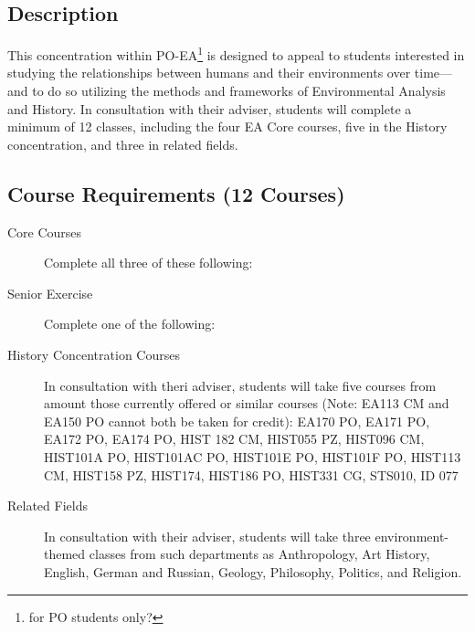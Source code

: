 \documentclass{article}\usepackage[]{graphicx}\usepackage[]{xcolor}
\newenvironment{itemize*}%
  {\begin{itemize}%
    \setlength{\itemsep}{0pt}%
    \setlength{\parskip}{0pt}}%
  {\end{itemize}}
\begin{document}
\subsection{Description}

This concentration within PO-EA\footnote{for PO students only?} is designed to appeal to students interested in studying the relationships between humans and their environments over time—and to do so utilizing the methods and frameworks of Environmental Analysis and History. In consultation with their adviser, students will complete a minimum of 12 classes, including the four EA Core courses, five in the History concentration, and three in related fields.

\subsection{Course Requirements (12 Courses)}

\begin{description}

 \item[Core Courses] Complete all three of these following:
  

  \item[Senior Exercise] Complete one of the following:
  


\item[History Concentration Courses] In consultation with theri adviser, students will take five courses from amount those currently offered or similar courses (Note: EA113 CM and EA150 PO cannot both be taken for credit): EA170 PO, EA171 PO, EA172 PO, EA174 PO, HIST 182 CM, HIST055 PZ, HIST096 CM, HIST101A PO, HIST101AC PO, HIST101E PO, HIST101F PO, HIST113 CM, HIST158 PZ, HIST174, HIST186 PO, HIST331 CG, STS010, ID 077

\item[Related Fields] In consultation with their adviser, students will take three environment-themed classes from such departments as Anthropology, Art History, English, German and Russian, Geology, Philosophy, Politics, and Religion.

\end{description}
\end{document}
